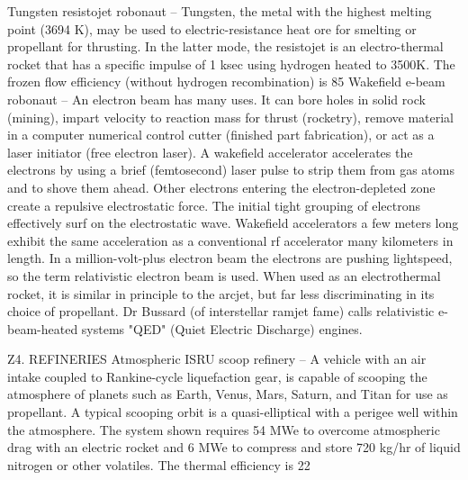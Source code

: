 \documentclass[a4paper]{book}
\begin{document}
Tungsten resistojet robonaut – Tungsten, the metal with the highest melting point (3694 K), may be used to electric-resistance heat ore for smelting or propellant for thrusting.  In the latter mode, the resistojet is an electro-thermal rocket that has a specific impulse of 1 ksec using hydrogen heated to 3500K. The frozen flow efficiency (without hydrogen recombination) is 85%
Wakefield e-beam robonaut – An electron beam has many uses.  It can bore holes in solid rock (mining), impart velocity to reaction mass for thrust (rocketry), remove material in a computer numerical control cutter (finished part fabrication), or act as a laser initiator (free electron laser). A wakefield accelerator accelerates the electrons by using a brief (femtosecond) laser pulse to strip them from gas atoms and to shove them ahead.  Other electrons entering the electron-depleted zone create a repulsive electrostatic force.  The initial tight grouping of electrons effectively surf on the electrostatic wave.  Wakefield accelerators a few meters long exhibit the same acceleration as a conventional rf accelerator many kilometers in length. In a million-volt-plus electron beam the electrons are pushing lightspeed, so the term relativistic electron beam is used. When used as an electrothermal rocket, it is similar in principle to the arcjet, but far less discriminating in its choice of propellant. Dr Bussard (of interstellar ramjet fame) calls relativistic e-beam-heated systems "QED" (Quiet Electric Discharge) engines.  

Z4. REFINERIES
Atmospheric ISRU scoop refinery – A vehicle with an air intake coupled to Rankine-cycle liquefaction gear, is capable of scooping the atmosphere of planets such as Earth, Venus, Mars, Saturn, and Titan for use as propellant. A typical scooping orbit is a quasi-elliptical with a perigee well within the atmosphere. The system shown requires 54 MWe to overcome atmospheric drag with an electric rocket and 6 MWe to compress and store 720 kg/hr of liquid nitrogen or other volatiles.  The thermal efficiency is 22%
 
\end{document}
